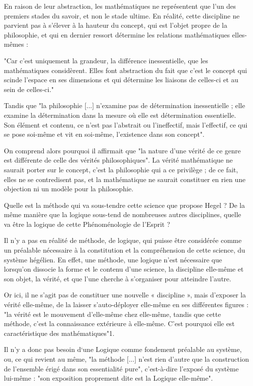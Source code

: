 En raison de leur abstraction, les mathématiques ne représentent que l’un des premiers stades du savoir, et non le stade ultime. En réalité, cette discipline ne parvient pas à s’élever à la hauteur du concept, qui est l’objet propre de la philosophie, et qui en dernier ressort détermine les relations mathématiques elles-mêmes :

"Car c’est uniquement la grandeur, la différence inessentielle, que les mathématiques considèrent. Elles font abstraction du fait que c’est le concept qui scinde l’espace en ses dimensions et qui détermine les liaisons de celles-ci et au sein de celles-ci."

Tandis que "la philosophie [...] n’examine pas de détermination inessentielle ; elle examine la détermination dans la mesure où elle est détermination essentielle. Son élément et contenu, ce n’est pas l’abstrait ou l’ineffectif, mais l’effectif, ce qui se pose soi-même et vit en soi-même, l’existence dans son concept".

On comprend alors pourquoi il affirmait que "la nature d’une vérité de ce genre est différente de celle des vérités philosophiques". La vérité mathématique ne saurait porter sur le concept, c’est la philosophie qui a ce privilège ; de ce fait, elles ne se contredisent pas, et la mathématique ne saurait constituer en rien une objection ni un modèle pour la philosophie.

Quelle est la méthode qui va sous-tendre cette science que propose Hegel ? De la même manière que la logique sous-tend de nombreuses autres disciplines, quelle va être la logique de cette Phénoménologie de l’Esprit ?

Il n’y a pas en réalité de méthode, de logique, qui puisse être considérée comme un préalable nécessaire à la constitution et la compréhension de cette science, du système hégélien. En effet, une méthode, une logique n’est nécessaire que lorsqu’on dissocie la forme et le contenu d’une science, la discipline elle-même et son objet, la vérité, et que l’une cherche à s’organiser pour atteindre l’autre.

Or ici, il ne s’agit pas de constituer une nouvelle « discipline », mais d’exposer la vérité elle-même, de la laisser s’auto-déployer elle-même en ses différentes figures : "la vérité est le mouvement d’elle-même chez elle-même, tandis que cette méthode, c’est la connaissance extérieure à elle-même. C’est pourquoi elle est caractéristique des mathématiques"1.

Il n’y a donc pas besoin d‘une Logique comme fondement préalable au système, ou, ce qui revient au même, "la méthode [...] n’est rien d’autre que la construction de l’ensemble érigé dans son essentialité pure", c’est-à-dire l’exposé du système lui-même : "son exposition proprement dite est la Logique elle-même".

